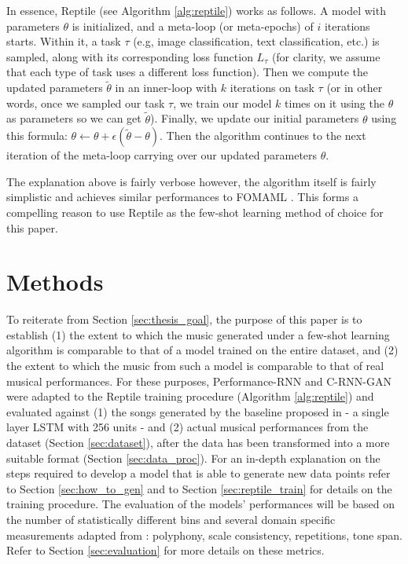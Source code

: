 \documentclass[a4paper]{book}
\begin{document}
In essence, Reptile (see Algorithm \ref{alg:reptile}) works as follows. A model with parameters $\theta$ is initialized, and a meta-loop (or meta-epochs) of $i$ iterations starts. Within it, a task $\tau$ (e.g, image classification, text classification, etc.) is sampled, along with its corresponding loss function $L_{\tau}$ (for clarity, we assume that each type of task uses a different loss function). Then we compute the updated parameters $\tilde \theta$ in an inner-loop with $k$ iterations on task $\tau$ (or in other words, once we sampled our task $\tau$, we train our model $k$ times on it using the $\theta$ as parameters so we can get $\tilde \theta$). Finally, we update our initial parameters $\theta$ using this formula: $\theta \leftarrow \theta + \epsilon (\tilde{\theta} - \theta)$. Then the algorithm continues to the next iteration of the meta-loop carrying over our updated parameters $\theta$.

The explanation above is fairly verbose however, the algorithm itself is fairly simplistic and achieves similar performances to FOMAML \parencite{nichol_first-order_2018}. This forms a compelling reason to use Reptile as the few-shot learning method of choice for this paper.

\chapter{Methods}\label{chap:methods}

To reiterate from Section \ref{sec:thesis_goal}, the purpose of this paper is to establish (1) the extent to which the music generated under a few-shot learning algorithm is comparable to that of a model trained on the entire dataset, and (2) the extent to which the music from such a model is comparable to that of real musical performances. For these purposes, Performance-RNN and C-RNN-GAN were adapted to the Reptile training procedure (Algorithm \ref{alg:reptile}) and evaluated against (1) the songs generated by the baseline proposed in \textcite{larochelle_few-shot_2017} - a single layer LSTM with 256 units - and (2) actual musical performances from the dataset (Section \ref{sec:dataset}), after the data has been transformed into a more suitable format (Section \ref{sec:data_proc}). For an in-depth explanation on the steps required to develop a model that is able to generate new data points refer to Section \ref{sec:how_to_gen} and to Section \ref{sec:reptile_train} for details on the training procedure. The evaluation of the models' performances will be based on the number of statistically different bins \parencite[NDB;][]{richardson_gans_2018} and several domain specific measurements adapted from \textcite{mogren_c-rnn-gan_2016}: polyphony, scale consistency, repetitions, tone span. Refer to Section \ref{sec:evaluation} for more details on these metrics.
\end{document}
